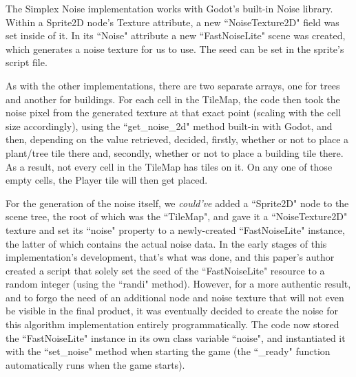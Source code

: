 The Simplex Noise implementation works with Godot's built-in Noise library. Within a Sprite2D node's Texture attribute, a new ``NoiseTexture2D" field  was set inside of it. In its ``Noise" attribute a new ``FastNoiseLite" scene was created, which generates a noise texture for us to use. The seed can be set in the sprite's script file.

As with the other implementations, there are two separate arrays, one for trees and another for buildings. For each cell in the TileMap, the code then took the noise pixel from the generated texture at that exact point (scaling with the cell size accordingly), using the ``get\_noise\_2d" method built-in with Godot, and then, depending on the value retrieved, decided, firstly, whether or not to place a plant/tree tile there and, secondly, whether or not to place a building tile there. As a result, not every cell in the TileMap has tiles on it. On any one of those empty cells, the Player tile will then get placed.

For the generation of the noise itself, we \textit{could've} added a ``Sprite2D" node to the scene tree, the root of which was the ``TileMap", and gave it a ``NoiseTexture2D" texture and set its ``noise" property to a newly-created ``FastNoiseLite" instance, the latter of which contains the actual noise data. In the early stages of this implementation's development, that's what was done, and this paper's author created a script that solely set the seed of the ``FastNoiseLite" resource to a random integer (using the ``randi" method). However, for a more authentic result, and to forgo the need of an additional node and noise texture that will not even be visible in the final product, it was eventually decided to create the noise for this algorithm implementation entirely programmatically. The code now stored the ``FastNoiseLite" instance in its own class variable ``noise", and instantiated it with the ``set\_noise" method when starting the game (the ``\_ready" function automatically runs when the game starts).

